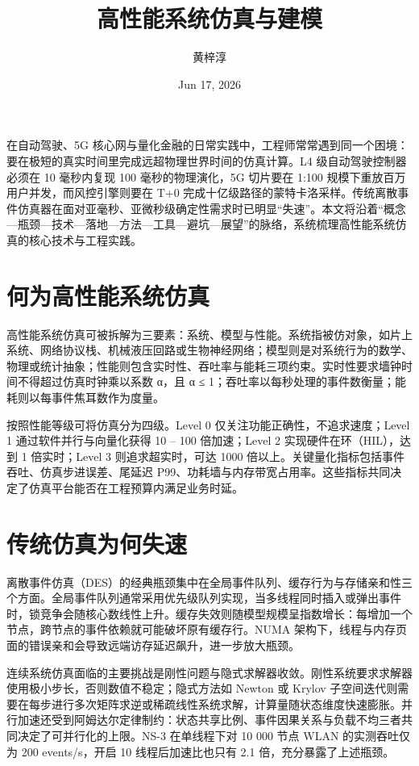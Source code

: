 \title{高性能系统仿真与建模}
\author{黄梓淳}
\date{Jun 17, 2026}
\maketitle
在自动驾驶、5G 核心网与量化金融的日常实践中，工程师常常遇到同一个困境：要在极短的真实时间里完成远超物理世界时间的仿真计算。L4 级自动驾驶控制器必须在 10 毫秒内复现 100 毫秒的物理演化，5G 切片要在 1:100 规模下重放百万用户并发，而风控引擎则要在 T+0 完成十亿级路径的蒙特卡洛采样。传统离散事件仿真器在面对亚毫秒、亚微秒级确定性需求时已明显“失速”。本文将沿着“概念—瓶颈—技术—落地—方法—工具—避坑—展望”的脉络，系统梳理高性能系统仿真的核心技术与工程实践。\par
\chapter{何为高性能系统仿真}
高性能系统仿真可被拆解为三要素：系统、模型与性能。系统指被仿对象，如片上系统、网络协议栈、机械液压回路或生物神经网络；模型则是对系统行为的数学、物理或统计抽象；性能则包含实时性、吞吐率与能耗三项约束。实时性要求墙钟时间不得超过仿真时钟乘以系数 α，且 α ≤ 1；吞吐率以每秒处理的事件数衡量；能耗则以每事件焦耳数作为度量。\par
按照性能等级可将仿真分为四级。Level 0 仅关注功能正确性，不追求速度；Level 1 通过软件并行与向量化获得 10 – 100 倍加速；Level 2 实现硬件在环（HIL），达到 1 倍实时；Level 3 则追求超实时，可达 1000 倍以上。关键量化指标包括事件吞吐、仿真步进误差、尾延迟 P99、功耗墙与内存带宽占用率。这些指标共同决定了仿真平台能否在工程预算内满足业务时延。\par
\chapter{传统仿真为何失速}
离散事件仿真（DES）的经典瓶颈集中在全局事件队列、缓存行为与存储亲和性三个方面。全局事件队列通常采用优先级队列实现，当多线程同时插入或弹出事件时，锁竞争会随核心数线性上升。缓存失效则随模型规模呈指数增长：每增加一个节点，跨节点的事件依赖就可能破坏原有缓存行。NUMA 架构下，线程与内存页面的错误亲和会导致远端访存延迟飙升，进一步放大瓶颈。\par
连续系统仿真面临的主要挑战是刚性问题与隐式求解器收敛。刚性系统要求求解器使用极小步长，否则数值不稳定；隐式方法如 Newton 或 Krylov 子空间迭代则需要在每步进行多次矩阵求逆或稀疏线性系统求解，计算量随状态维度快速膨胀。并行加速还受到阿姆达尔定律制约：状态共享比例、事件因果关系与负载不均三者共同决定了可并行化的上限。NS-3 在单线程下对 10 000 节点 WLAN 的实测吞吐仅为 200 events/s，开启 10 线程后加速比也只有 2.1 倍，充分暴露了上述瓶颈。\par
